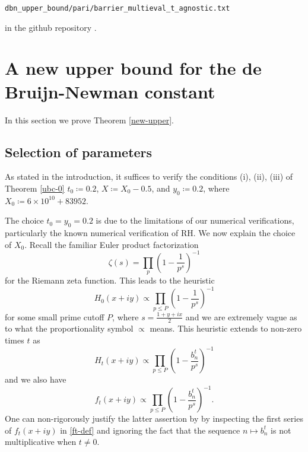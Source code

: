 \documentclass[a4paper,11pt,twoside]{amsart}
\begin{document}
\centerline{\tt dbn\_upper\_bound/pari/barrier\_multieval\_t\_agnostic.txt}

in the github repository \cite{github}.

\section{A new upper bound for the de Bruijn-Newman constant}\label{newup-sec}

In this section we prove Theorem \ref{new-upper}. 

\subsection{Selection of parameters}\label{select}

As stated in the introduction, it suffices to verify the conditions (i), (ii), (iii) of Theorem \ref{ubc-0} $t_0 \coloneqq 0.2$, $X \coloneqq X_0-0.5$, and $y_0 \coloneqq 0.2$, where $X_0 \coloneqq 6 \times 10^{10} + 83952$.  

The choice $t_0=y_0=0.2$ is due to the limitations of our numerical verifications, particularly the known numerical verification of RH.  We now explain the choice of $X_0$.  Recall the familiar Euler product factorization
$$ \zeta(s) = \prod_p \left(1 - \frac{1}{p^s}\right)^{-1}$$
for the Riemann zeta function.  This leads to the heuristic
$$ H_0(x+iy) \propto \prod_{p \leq P} \left(1 - \frac{1}{p^s}\right)^{-1}$$
for some small prime cutoff $P$, where $s = \frac{1+y+ix}{2}$ and we are extremely vague as to what the proportionality symbol $\propto$ means.  This heuristic extends to non-zero times $t$ as
$$ H_t(x+iy) \propto \prod_{p \leq P} \left(1 - \frac{b_n^t}{p^s}\right)^{-1}$$
and we also have
\begin{equation}\label{oscil}
 f_t(x+iy) \propto \prod_{p \leq P} \left(1 - \frac{b_n^t}{p^s}\right)^{-1}.
\end{equation}
One can non-rigorously justify the latter assertion by by inspecting the first series of $f_t(x+iy)$ in \eqref{ft-def} and ignoring the fact that the sequence $n \mapsto b_n^t$ is not multiplicative when $t \neq 0$.  
\end{document}
